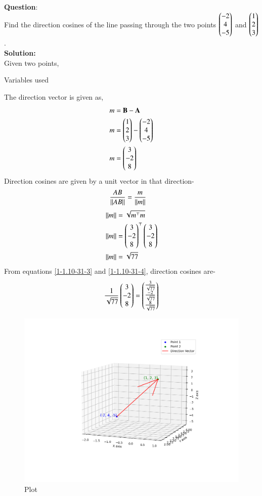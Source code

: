 \documentclass[journal]{IEEEtran}
\begin{document}
\textbf{Question}:\\
Find the direction cosines of the line passing through the two points $\begin{pmatrix}-2\\4\\-5\end{pmatrix}$ and $\begin{pmatrix}1\\2\\3\end{pmatrix}$.
\\
\textbf{Solution: }\\
Given two points,
\begin{table}[h!]    
  \centering
  
  \caption{Variables used}
  \label{1-1.10-31-table}
\end{table}
The direction vector is given as,
\begin{align}
    m&=\mathbf{B}-\mathbf{A}\label{1-1.10-31-1}\\
    m&=\begin{pmatrix}1\\2\\3\end{pmatrix}-\begin{pmatrix}-2\\4\\-5\end{pmatrix}\\
    m&=\begin{pmatrix}3\\-2\\8\end{pmatrix}\label{1-1.10-31-2}
\end{align}
Direction cosines are given by a unit vector in that direction-
\begin{align}
    \frac{AB}{\left\lVert AB\right\rVert}&=\frac{m}{\left\lVert m\right\rVert}\label{1-1.10-31-3}
\end{align}
 \begin{align}
    \left\lVert m\right\rVert&=\sqrt{m^\top m}\\
    \left\lVert m\right\rVert&=\begin{pmatrix}3\\-2\\8\end{pmatrix}^\top \begin{pmatrix}3\\-2\\8\end{pmatrix}\\
   \left\lVert m\right\rVert&=\sqrt{77}\label{1-1.10-31-4}
\end{align}
 From equations \eqref{1-1.10-31-3} and \eqref{1-1.10-31-4}, 
 direction cosines are-
\begin{align}
\frac{1}{\sqrt{77}}\begin{pmatrix}3\\-2\\8\end{pmatrix}=\begin{pmatrix}\frac{3}{\sqrt{77}}\\\frac{-2}{\sqrt{77}}\\\frac{8}{\sqrt{77}}\end{pmatrix}
\end{align}
\begin{figure}[h!]
   \centering
   \includegraphics[width=1.1\columnwidth]{Figs/Figure-1.png}
   \caption{Plot}
   \label{1-1.10-31-fig-1}
\end{figure}
\end{document}
